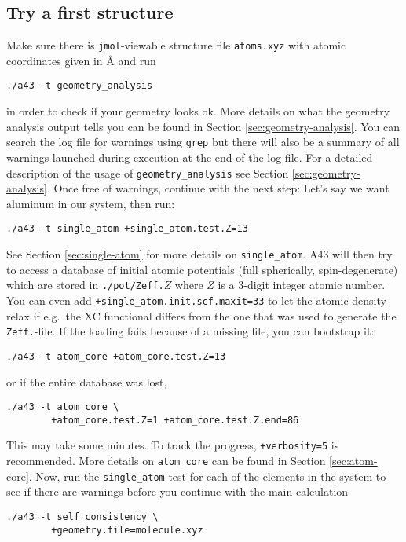 \documentclass[oribibl]{llncs}
\newcommand{\ttt}[1]{\texttt{#1}}
\newcommand{\codename}{A43}
\begin{document}
\subsection{Try a first structure} \label{sec:first-steps}
%
Make sure there is \ttt{jmol}-viewable structure file \ttt{atoms.xyz}
with atomic coordinates given in \AA{} and run
\begin{verbatim}
./a43 -t geometry_analysis
\end{verbatim}
in order to check if your geometry looks ok.
More details on what the geometry analysis output tells you can be found in Section \ref{sec:geometry-analysis}.
You can search the log file for warnings using \ttt{grep} but
there will also be a summary of all warnings launched during execution at the end of the log file.
For a detailed description of the usage of \ttt{geometry\_analysis} see Section \ref{sec:geometry-analysis}.
%
\noindent
Once free of warnings, continue with the next step:
Let's say we want aluminum in our system, then run:
\begin{verbatim}
./a43 -t single_atom +single_atom.test.Z=13
\end{verbatim}
See Section \ref{sec:single-atom} for more details on \ttt{single\_atom}.
%
\codename{} will then try to access a database of initial atomic potentials
(full spherically, spin-degenerate) which are stored in \ttt{./pot/Zeff.}$Z$
where $Z$ is a 3-digit integer atomic number.
You can even add \ttt{+single\_atom.init.scf.maxit=33} to let the atomic density relax if e.g.~the \ac{XC} functional differs from the one that was used to generate the \ttt{Zeff.}-file.
If the loading fails because of a missing file, you can bootstrap it:
\begin{verbatim}
./a43 -t atom_core +atom_core.test.Z=13
\end{verbatim}
or if the entire database was lost,
\begin{verbatim}
./a43 -t atom_core \
        +atom_core.test.Z=1 +atom_core.test.Z.end=86
\end{verbatim}
This may take some minutes. To track the progress, \ttt{+verbosity=5} is recommended.
More details on \ttt{atom\_core} can be found in Section \ref{sec:atom-core}.
\todo[inline]{OpenMP would be good here}
%
\noindent
Now, run the \ttt{single\_atom} test for each of the elements in the system 
to see if there are warnings before you continue with the main calculation
\begin{verbatim}
./a43 -t self_consistency \
        +geometry.file=molecule.xyz
\end{verbatim}
%
\end{document}
